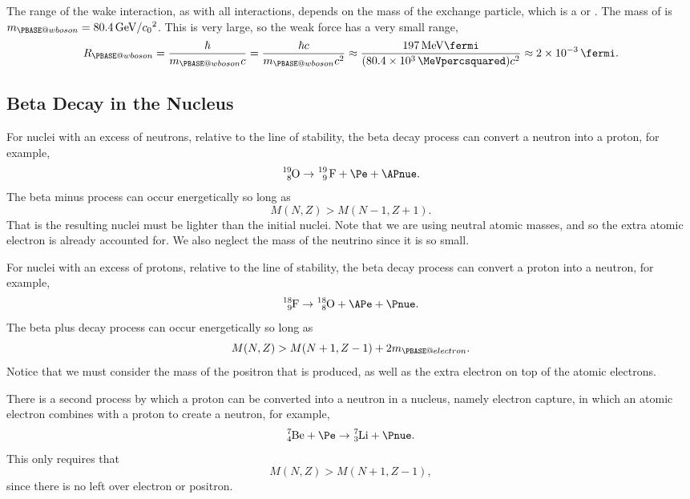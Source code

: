 \documentclass[fleqn]{NotesClass}
\makeatletter
\newcommand*{\PW}{\ensuremath{\PBASE@wboson}}
\newcommand*{\Peneutral}{\ensuremath{\PBASE@electron}}
\makeatother
\begin{document}
    The range of the wake interaction, as with all interactions, depends on the mass of the exchange particle, which is a \PWpm{} or \PZzero.
    The mass of \PWpm{} is \(m_{\PW} = \qty[per-mode=symbol]{80.4}{\giga\electronvolt\per\clight\squared}\).
    This is very large, so the weak force has a very small range,
    \begin{equation}
        R_{\PW} = \frac{\hbar}{m_{\PW}c} = \frac{\hbar c}{m_{\PW}c^2} \approx \frac{\qty{197}{\mega\electronvolt\fermi}}{(\qty{80.4e3}{\MeVpercsquared})c^2} \approx \qty{2e-3}{\fermi}.
    \end{equation}
    
    \subsection{Beta Decay in the Nucleus}
    For nuclei with an excess of neutrons, relative to the line of stability, the beta decay process can convert a neutron into a proton, for example,
    \begin{equation}
        \ce{^19_8O} \to \ce{^19_9 F} + \Pe + \APnue.
    \end{equation}
    The beta minus process can occur energetically so long as
    \begin{equation}
        M(N, Z) > M(N - 1, Z + 1).
    \end{equation}
    That is the resulting nuclei must be lighter than the initial nuclei.
    Note that we are using neutral atomic masses, and so the extra atomic electron is already accounted for.
    We also neglect the mass of the neutrino since it is so small.
    
    For nuclei with an excess of protons, relative to the line of stability, the beta decay process can convert a proton into a neutron, for example,
    \begin{equation}
        \ce{^18_9F} \to \ce{^18_8O} + \APe + \Pnue.
    \end{equation}
    The beta plus decay process can occur energetically so long as
    \begin{equation}
        M(N, Z) > M(N + 1, Z - 1) + 2m_{\Peneutral}.
    \end{equation}
    Notice that we must consider the mass of the positron that is produced, as well as the extra electron on top of the atomic electrons.
    
    There is a second process by which a proton can be converted into a neutron in a nucleus, namely electron capture, in which an atomic electron combines with a proton to create a neutron, for example,
    \begin{equation}
        \ce{^7_4Be} + \Pe \to \ce{^7_3Li} + \Pnue.
    \end{equation}
    This only requires that
    \begin{equation}
        M(N, Z) > M(N + 1, Z - 1),
    \end{equation}
    since there is no left over electron or positron.
    
\end{document}
